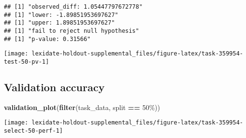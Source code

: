 \documentclass[
]{book}
\newenvironment{Shaded}{\begin{snugshade}}{\end{snugshade}}
\newcommand{\AttributeTok}[1]{\textcolor[rgb]{0.13,0.29,0.53}{#1}}
\newcommand{\DecValTok}[1]{\textcolor[rgb]{0.00,0.00,0.81}{#1}}
\newcommand{\FunctionTok}[1]{\textcolor[rgb]{0.13,0.29,0.53}{\textbf{#1}}}
\newcommand{\NormalTok}[1]{#1}
\newcommand{\OtherTok}[1]{\textcolor[rgb]{0.56,0.35,0.01}{#1}}
\newcommand{\SpecialCharTok}[1]{\textcolor[rgb]{0.81,0.36,0.00}{\textbf{#1}}}
\newcommand{\StringTok}[1]{\textcolor[rgb]{0.31,0.60,0.02}{#1}}
\begin{document}
\begin{Shaded}
\end{Shaded}

\begin{verbatim}
## [1] "observed_diff: 1.05447797672778"
## [1] "lower: -1.89851953697627"
## [1] "upper: 1.89851953697627"
## [1] "fail to reject null hypothesis"
## [1] "p-value: 0.31566"
\end{verbatim}

\texttt{[image: lexidate-holdout-supplemental\_files/figure-latex/task-359954-test-50-pv-1]}

\hypertarget{validation-accuracy-7}{%
\subsection{Validation accuracy}\label{validation-accuracy-7}}

\begin{Shaded}
\begin{Highlighting}[]
\FunctionTok{validation\_plot}\NormalTok{(}\FunctionTok{filter}\NormalTok{(task\_data, split }\SpecialCharTok{==} \StringTok{\textquotesingle{}50\%\textquotesingle{}}\NormalTok{))}
\end{Highlighting}
\end{Shaded}

\texttt{[image: lexidate-holdout-supplemental\_files/figure-latex/task-359954-select-50-perf-1]}
\end{document}
